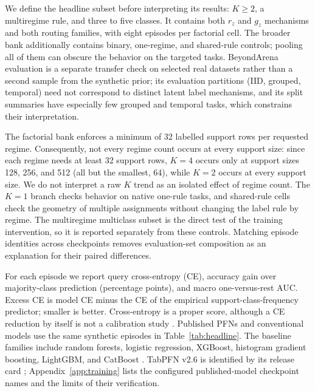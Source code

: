 \documentclass{article}
\begin{document}
We define the headline subset before interpreting its results: $K\geq2$, a multiregime rule, and three to five classes. It contains both $r_z$ and $g_z$ mechanisms and both routing families, with eight episodes per factorial cell. The broader bank additionally contains binary, one-regime, and shared-rule controls; pooling all of them can obscure the behavior on the targeted tasks. BeyondArena evaluation is a separate transfer check on selected real datasets rather than a second sample from the synthetic prior; its evaluation partitions (IID, grouped, temporal) need not correspond to distinct latent label mechanisms, and its split summaries have especially few grouped and temporal tasks, which constrains their interpretation.

The factorial bank enforces a minimum of 32 labelled support rows per requested regime. Consequently, not every regime count occurs at every support size: since each regime needs at least 32 support rows, $K=4$ occurs only at support sizes 128, 256, and 512 (all but the smallest, 64), while $K=2$ occurs at every support size. We do not interpret a raw $K$ trend as an isolated effect of regime count. The $K=1$ branch checks behavior on native one-rule tasks, and shared-rule cells check the geometry of multiple assignments without changing the label rule by regime. The multiregime multiclass subset is the direct test of the training intervention, so it is reported separately from these controls. Matching episode identities across checkpoints removes evaluation-set composition as an explanation for their paired differences.

For each episode we report query cross-entropy (CE), accuracy gain over majority-class prediction (percentage points), and macro one-versus-rest AUC. Excess CE is model CE minus the CE of the empirical support-class-frequency predictor; smaller is better. Cross-entropy is a proper score, although a CE reduction by itself is not a calibration study \citep{gneiting2007scoring}. Published PFNs and conventional models use the same synthetic episodes in Table~\ref{tab:headline}. The baseline families include random forests, logistic regression, XGBoost, histogram gradient boosting, LightGBM, and CatBoost \citep{breiman2001forests,pedregosa2011sklearn,chen2016xgboost,ke2017lightgbm,prokhorenkova2018catboost}. TabPFN v2.6 is identified by its release card \citep{priorlabs2026tabpfn26}; Appendix~\ref{app:training} lists the configured published-model checkpoint names and the limits of their verification.
\end{document}
